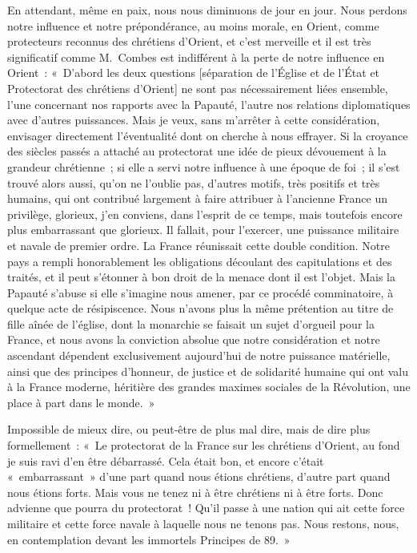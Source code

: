 \documentclass[french,twoside]{book} %
\begin{document}
\noindent En attendant, même en paix, nous nous diminuons de jour en jour. Nous perdons notre influence et notre prépondérance, au moins morale, en Orient, comme protecteurs reconnus des chrétiens d’Orient, et c’est merveille et il est très significatif comme M. Combes est indifférent à la perte de notre influence en Orient : « D’abord les deux questions [séparation de l’Église et de l’État et Protectorat des chrétiens d’Orient] ne sont pas nécessairement liées ensemble, l’une concernant nos rapports avec la Papauté, l’autre nos relations diplomatiques avec d’autres puissances. Mais je veux, sans m’arrêter à cette considération, envisager directement l’éventualité dont on cherche à nous effrayer. Si la croyance des siècles passés a attaché au protectorat une idée de pieux dévouement à la grandeur chrétienne ; si elle a servi notre influence à une époque de foi ; il s’est trouvé alors aussi, qu’on ne l’oublie pas, d’autres motifs, très positifs et très humains, qui ont contribué largement à faire attribuer à l’ancienne France un  privilège, glorieux, j’en conviens, dans l’esprit de ce temps, mais toutefois encore plus embarrassant que glorieux. Il fallait, pour l’exercer, une puissance militaire et navale de premier ordre. La France réunissait cette double condition. Notre pays a rempli honorablement les obligations découlant des capitulations et des traités, et il peut s’étonner à bon droit de la menace dont il est l’objet. Mais la Papauté s’abuse si elle s’imagine nous amener, par ce procédé comminatoire, à quelque acte de résipiscence. Nous n’avons plus la même prétention au titre de fille aînée de l’église, dont la monarchie se faisait un sujet d’orgueil pour la France, et nous avons la conviction absolue que notre considération et notre ascendant dépendent exclusivement aujourd’hui de notre puissance matérielle, ainsi que des principes d’honneur, de justice et de solidarité humaine qui ont valu à la France moderne, héritière des grandes maximes sociales de la Révolution, une place à part dans le monde. »\par
Impossible de mieux dire, ou peut-être de plus mal dire, mais de dire plus formellement : « Le protectorat de la France sur les chrétiens d’Orient, au fond je suis ravi d’en être débarrassé. Cela était bon, et encore c’était « embarrassant » d’une part quand nous étions chrétiens, d’autre part  quand nous étions forts. Mais vous ne tenez ni à être chrétiens ni à être forts. Donc advienne que pourra du protectorat ! Qu’il passe à une nation qui ait cette force militaire et cette force navale à laquelle nous ne tenons pas. Nous restons, nous, en contemplation devant les immortels Principes de 89. »\par
\end{document}
